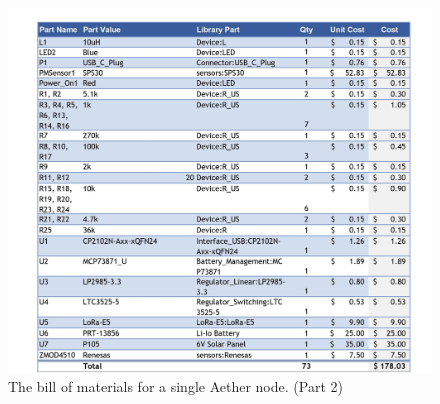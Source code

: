 \begin{figure}
    \centering
    \includegraphics[width=6in]{figures/BOM_2.jpg}
    \caption{The bill of materials for a single Aether node. (Part 2)}
    \label{fig:BOM_2} 
\end{figure}